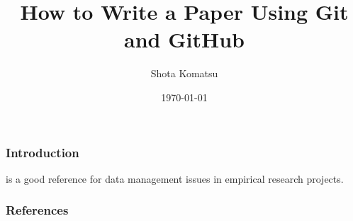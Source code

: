 \documentclass{beamer}
\title{How to Write a Paper Using Git and GitHub}
\author{Shota Komatsu}
\date{\today}
\begin{document}
\frame{\titlepage}

\begin{frame}
\frametitle{Introduction}
\citet{knittel2018working} is a good reference for data management issues in empirical research projects.

\end{frame}

\begin{frame}
\frametitle{References}


    

\end{frame}
\end{document}
